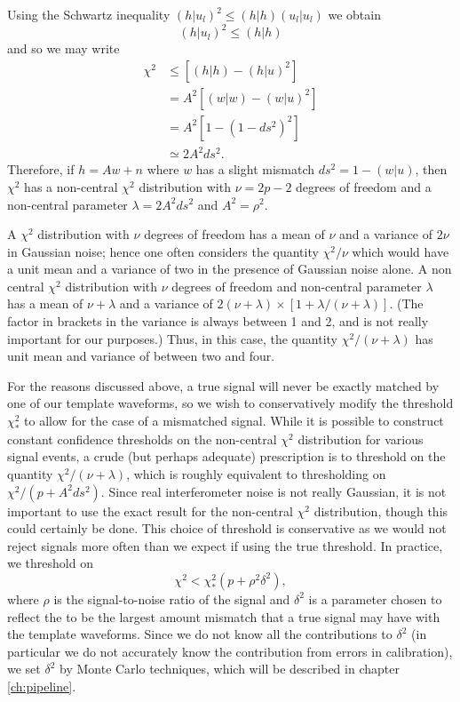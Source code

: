 Using the Schwartz inequality $(h|u_l)^2\le(h|h)(u_l|u_l)$ we obtain
\begin{equation}
(h|u_l)^2\le (h|h)
\end{equation}
and so we may write
\begin{equation}
\begin{split}
\chi^2 &\le \left[ (h|h) - (h|u)^2 \right]  \\
&= A^2\left[ (w|w) - (w|u)^2 \right] \\
&= A^2 \left[ 1 - ( 1 - ds^2 )^2 \right] \\
&\simeq 2A^2ds^2.
\end{split}
\end{equation}
Therefore, if $h=Aw+n$ where $w$ has a slight mismatch $ds^2=1-(w|u)$, then
$\chi^2$ has a non-central $\chi^2$ distribution with $\nu=2p-2$ degrees of
freedom and a non-central parameter $\lambda=2A^2ds^2$ and $A^2 =
\rho^2$.

A $\chi^2$ distribution with $\nu$ degrees of freedom has a mean of $\nu$
and a variance of $2\nu$ in Gaussian noise; hence one often considers the
quantity $\chi^2/\nu$ which would have a unit mean and a variance of two in
the presence of Gaussian noise alone.  A non central $\chi^2$ distribution
with $\nu$ degrees of freedom and non-central parameter $\lambda$ has a mean
of $\nu+\lambda$ and a variance of
$2(\nu+\lambda)\times[1+\lambda/(\nu+\lambda)]$.  (The factor in brackets in
the variance is always between 1 and 2, and is not really important for our
purposes.)  Thus, in this case, the quantity $\chi^2/(\nu+\lambda)$ has unit
mean and variance of between two and four.

For the reasons discussed above, a true signal will never be exactly matched
by one of our template waveforms, so we wish to conservatively modify the threshold
$\chi^2_\ast$ to allow for the case of a mismatched signal. While it is
possible to construct constant confidence thresholds on the non-central
$\chi^2$ distribution for various signal events, a crude (but perhaps
adequate) prescription is to threshold on the quantity
$\chi^2/(\nu+\lambda)$, which is roughly equivalent to thresholding on
$\chi^2/(p+A^2 ds^2)$.  Since real interferometer noise is not really
Gaussian, it is not important to use the exact result for the non-central
$\chi^2$ distribution, though this could certainly be done. This choice of
threshold is conservative as we would not reject signals more often than we
expect if using the true threshold.  In practice, we threshold on 
\begin{equation}
\chi^2 < \chi^2_\ast (p+\rho^2 \delta^2),
\label{eq:chisqthresholdtest}
\end{equation}
where $\rho$ is the signal-to-noise ratio of the signal and $\delta^2$ is a
parameter chosen to reflect the to be the largest amount mismatch that a true
signal may have with the template waveforms. Since we do not know all the
contributions to $\delta^2$ (in particular we do not accurately know the
contribution from errors in calibration), we set $\delta^2$ by Monte Carlo
techniques, which will be described in chapter \ref{ch:pipeline}.

